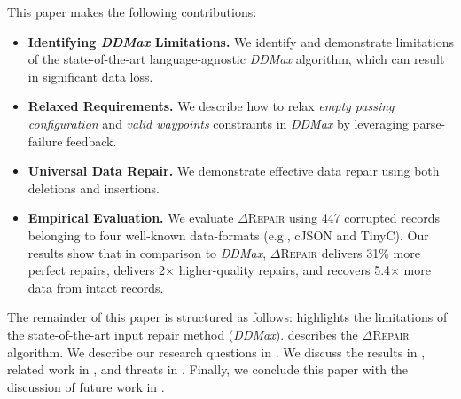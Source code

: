 \documentclass[acmsmall,screen,review,anonymous]{acmart}
\newcommand{\dtask}{data repair\xspace}
\newcommand{\approach}{\textsc{$\Delta$Repair}\xspace}
\newcommand{\ddmax}{\textit{DDMax}\xspace}
\newcommand{\drepair}{\approach}
\begin{document}
This paper makes the following
contributions:
\begin{itemize}
\item \textbf{Identifying \ddmax Limitations.}
We identify and demonstrate limitations of 
the state-of-the-art language-agnostic \ddmax algorithm, which can result in significant data loss.
\item \textbf{Relaxed Requirements.} We describe how to relax
\emph{empty passing configuration} and \emph{valid waypoints} constraints in \ddmax by leveraging parse-failure feedback.
\item \textbf{Universal Data Repair.}
We demonstrate effective \dtask using both deletions and insertions.
\item \textbf{Empirical Evaluation.} We evaluate \drepair using
447 corrupted records belonging to four well-known data-formats (e.g., cJSON and TinyC). 
Our results show that in comparison to \ddmax,
\drepair delivers 31\% more perfect repairs, %
delivers 2$\times$ higher-quality repairs,  %
and recovers 5.4$\times$ more data from intact records.   %

\end{itemize}

The remainder of this paper is structured as follows: 
 highlights the limitations of the 
state-of-the-art input repair method (\ddmax).
describes the \drepair algorithm. We describe our research questions in
.
We discuss the results in ,
related work in , and threats in .
Finally, we conclude this paper 
with the discussion of future work in . 
\end{document}
